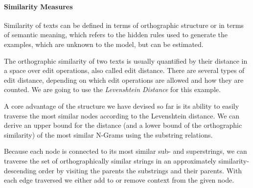\paragraph{Similarity Measures}
Similarity of texts can be defined in terms of orthographic structure or in terms of semantic meaning, which refers to the hidden rules used to generate the examples, which are unknown to the model, but can be estimated.

The orthographic similarity of two texts is usually quantified by their distance in a space over edit operations, also called edit distance. There are several types of edit distance, depending on which edit operations are allowed and how they are counted. We are going to use the \textit{Levenshtein Distance} for this example.

A core advantage of the structure we have devised so far is its ability to easily traverse the most similar nodes according to the Levenshtein distance. We can derive an upper bound for the distance (and a lower bound of the orthographic similarity) of the most similar N-Grams using the substring relations.

Because each node is connected to its most similar sub- and superstrings, we can traverse the set of orthographically similar strings in an approximately similarity-descending order by visiting the parents the substrings and their parents. With each edge traversed we either add to or remove context from the given node.

